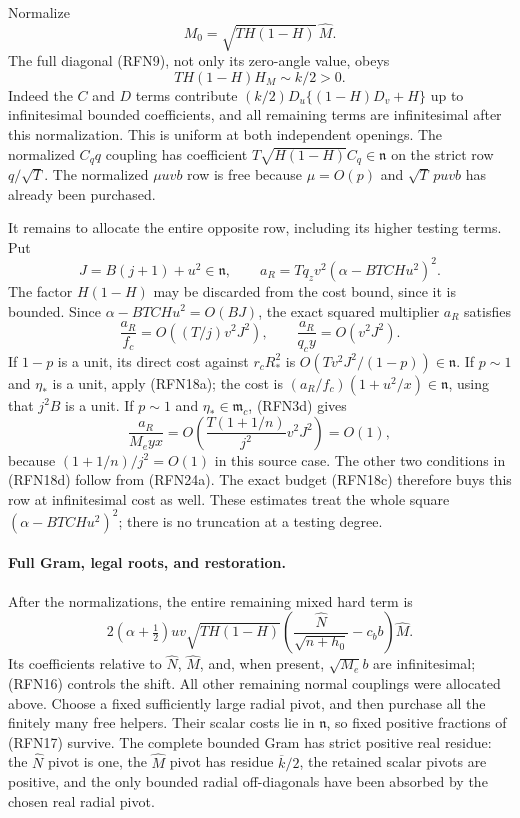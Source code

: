 Normalize
\[
 M_0=\sqrt{TH(1-H)}\,\widehat M.
\]
The full diagonal (RFN9), not only its zero-angle value, obeys
\[
 TH(1-H)H_M\sim k/2>0.                                 \tag{RFN23}
\]
Indeed the $C$ and $D$ terms contribute
$(k/2)D_u\{(1-H)D_v+H\}$ up to infinitesimal bounded coefficients,
and all remaining terms are infinitesimal after this normalization.
This is uniform at both independent openings.
The normalized $C_qq$ coupling has coefficient
$T\sqrt{H(1-H)}C_q\in\mathfrak n$ on the strict row $q/\sqrt T$.
The normalized $\mu uvb$ row is free because $\mu=O(p)$ and
$\sqrt T\,puvb$ has already been purchased.

It remains to allocate the entire opposite row, including its
higher testing terms.  Put
\[
 J=B(j+1)+u^2\in\mathfrak n,\qquad
 a_R=Tq_zv^2(\alpha-BTCHu^2)^2.
\]
The factor $H(1-H)$ may be discarded from the cost bound, since it is
bounded.  Since $\alpha-BTCHu^2=O(BJ)$, the exact squared multiplier
$a_R$ satisfies
\[
 \frac{a_R}{f_c}=O((T/j)v^2J^2),\qquad
 \frac{a_R}{q_cy}=O(v^2J^2).                            \tag{RFN24a}
\]
If $1-p$ is a unit, its direct cost against $r_cR_*^2$ is
$O(Tv^2J^2/(1-p))\in\mathfrak n$.
If $p\sim1$ and $\eta_*$ is a unit, apply (RFN18a); the cost is
$(a_R/f_c)(1+u^2/x)\in\mathfrak n$, using that $j^2B$ is a unit.
If $p\sim1$ and $\eta_*\in\mathfrak m_c$, (RFN3d) gives
\[
 \frac{a_R}{M_e yx}
     =O\!\left(\frac{T(1+1/n)}{j^2}v^2J^2\right)=O(1),  \tag{RFN24b}
\]
because $(1+1/n)/j^2=O(1)$ in this source case.  The other two
conditions in (RFN18d) follow from (RFN24a).  The exact budget
(RFN18c) therefore buys this row at infinitesimal cost as well.
These estimates treat the whole square
$(\alpha-BTCHu^2)^2$; there is no truncation at a testing degree.

\paragraph{Full Gram, legal roots, and restoration.}
After the normalizations, the entire remaining mixed hard term is
\[
 2(\alpha+\tfrac12)uv\sqrt{TH(1-H)}
    \left(\frac{\widehat N}{\sqrt{n+h_0}}-c_bb\right)\widehat M.
\]
Its coefficients relative to $\widehat N$, $\widehat M$, and, when
present, $\sqrt{M_e}b$ are infinitesimal; (RFN16) controls the shift.
All other remaining normal couplings were allocated above.  Choose a
fixed sufficiently large radial pivot, and then purchase all the
finitely many free helpers.  Their scalar costs lie in $\mathfrak n$,
so fixed positive fractions of (RFN17) survive.  The complete bounded
Gram has strict positive real residue: the $\widehat N$ pivot is one,
the $\widehat M$ pivot has residue $\overline{k}/2$, the retained scalar pivots
are positive, and the only bounded radial off-diagonals have been
absorbed by the chosen real radial pivot.

